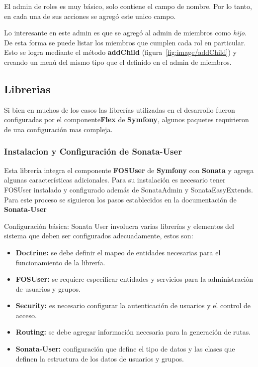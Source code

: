 El admin de roles es muy básico, solo contiene el campo de nombre. Por lo tanto, en cada una de sus acciones se agregó este unico campo.


Lo interesante en este admin es que se agregó al admin de miembros como \textit{hijo}. De esta forma se puede listar los miembros que cumplen cada rol en
particular.
Esto se logra mediante el método \textbf{addChild} (figura~\ref{fig:image/addChild}) y creando un menú del mismo tipo que el definido en el admin de miembros.

\newpage
\subsection{Librerias}%
\label{sub:librerias}

Si bien en muchos de los casos las librerías utilizadas en el desarrollo fueron configuradas por el componente\textbf{Flex}  de \textbf{Symfony}, algunos paquetes
requirieron de una configuración mas compleja.

\subsubsection{Instalacion y Configuración de \textbf{Sonata-User}}%
\label{ssub:instalacion_y_configuración_de_sonata-user}

Esta librería integra el componente \textbf{FOSUser} de \textbf{Symfony} con \textbf{Sonata} y agrega algunas características adicionales.
Para su instalación es necesario tener FOSUser instalado y configurado además de SonataAdmin y SonataEasyExtends\@.
Para este proceso se siguieron los pasos establecidos en la documentación de \textbf{Sonata-User}~\textcite{sonata-user}

Configuración básica: Sonata User involucra varias librerías y elementos del sistema que deben ser configurados adecuadamente, estos son:

\begin{itemize}
    \item \textbf{Doctrine:} se debe definir el mapeo de entidades necesarias para el funcionamiento de la librería.
    \item \textbf{FOSUser:} se requiere especificar entidades y servicios para la administración de usuarios y grupos.
    \item \textbf{Security:} es necesario configurar la autenticación de usuarios y el control de acceso.
    \item \textbf{Routing:} se debe agregar información necesaria para la generación de rutas.
    \item \textbf{Sonata-User:} configuración que define el tipo de datos y las clases que definen la estructura de los datos de usuarios y grupos.
\end{itemize}



